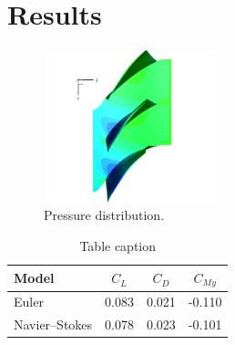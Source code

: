 
\section{Results}
\label{sec:resul}



\begin{figure}[H]
  \centering
  \includegraphics[width=5cm]{images/master_flow.png}
  \caption{Pressure distribution.}
  \label{fig:blade_flow_pressure}
\end{figure}



\begin{table}[!h]
  \begin{center}
    \begin{tabular}{lccc}
      Model           & $C_L$ & $C_D$ & $C_{M y}$ \\
      \hline
      Euler           & 0.083 & 0.021 & -0.110    \\
      Navier--Stokes  & 0.078 & 0.023 & -0.101    \\
      \hline
    \end{tabular}
  \end{center}
  \caption[Table caption shown in TOC]{Table caption}
  \label{table:simple}
\end{table}
